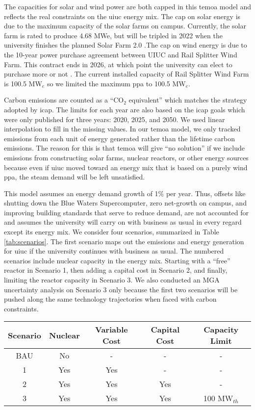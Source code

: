 The capacities for solar and wind power are both capped in this \gls{temoa}
model and reflects the real constraints on the \gls{uiuc} energy mix.
The cap on solar energy is due to the maximum capacity of the solar
farms on campus. Currently, the solar farm is rated to produce 4.68 MWe, but
will be tripled in 2022 when the university finishes the planned
Solar Farm 2.0 \cite{noauthor_solar_nodate,white_solar_2017}.The cap on wind
energy is due to the 10-year power purchase agreement between UIUC and Rail
Splitter Wind Farm. This contract ends in 2026, at which point the university
can elect to purchase more or not \cite{breitweiser_wind_2016}. The current
installed capacity of Rail Splitter Wind Farm is 100.5 MW$_e$ so we limited
the maximum \gls{ppa} to 100.5 MW$_e$.

Carbon emissions are counted as a ``CO$_2$ equivalent'' which matches the
strategy adopted by \gls{icap}. The limits for each year are also based on
the \gls{icap} goals which were only published for three years: 2020, 2025, and
2050. We used linear interpolation to fill in the missing values. In our
\gls{temoa} model, we only tracked emissions from each unit of energy generated
rather than the lifetime carbon emissions. The reason for this is that
\gls{temoa} will give ``no solution'' if we include emissions from constructing
solar farms, nuclear reactors, or other energy sources because even if
\gls{uiuc} moved toward an energy mix that is based on a purely wind \gls{ppa},
the steam demand will be left unsatisfied.

This model assumes an energy demand growth of 1\% per year. Thus, offsets like
shutting down the Blue Waters Supercomputer, zero net-growth on campus, and
improving building standards that serve to reduce demand, are not accounted for
and assumes the university will carry on with business as usual in every regard
except its energy mix. We consider four scenarios, summarized in Table
\ref{tab:scenarios}. The first scenario maps out the emissions and energy
generation for \gls{uiuc} if the university continues with business as usual.
The numbered scenarios include nuclear capacity in the energy mix. Starting with
a ``free'' reactor in Scenario 1, then adding a capital cost in Scenario 2, and
finally, limiting the reactor capacity in Scenario 3. We also conducted an
MGA uncertainty analysis on Scenario 3 only because the first two scenarios will
be pushed along the same technology trajectories when faced with carbon
constraints.

\begin{table*}[ht]
  \centering
  \caption{Summary of \gls{temoa} Nuclear Scenarios}
  \label{tab:scenarios}
  \begin{tabular}{|ccccc|}
    \hline
    Scenario & Nuclear & Variable Cost & Capital Cost & Capacity Limit\\
    \hline
    BAU & No & - & - & - \\
    1 & Yes & Yes & - & - \\
    2 & Yes & Yes & Yes & - \\
    3 & Yes & Yes & Yes & 100 MW$_{th}$\\
    \hline
  \end{tabular}
\end{table*}
